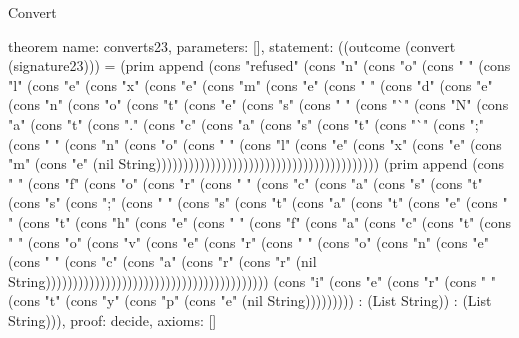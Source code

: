 \begin{lexlean}{Convert}
\begin{semanticmodule}
theorem{
  name: converts23,
  parameters: [],
  statement: ((outcome (convert (signature23))) = (prim append (cons "refused" (cons "n" (cons "o" (cons " " (cons "l" (cons "e" (cons "x" (cons "e" (cons "m" (cons "e" (cons " " (cons "d" (cons "e" (cons "n" (cons "o" (cons "t" (cons "e" (cons "s" (cons " " (cons "`" (cons "N" (cons "a" (cons "t" (cons "." (cons "c" (cons "a" (cons "s" (cons "t" (cons "`" (cons ";" (cons " " (cons "n" (cons "o" (cons " " (cons "l" (cons "e" (cons "x" (cons "e" (cons "m" (cons "e" (nil String))))))))))))))))))))))))))))))))))))))))) (prim append (cons " " (cons "f" (cons "o" (cons "r" (cons " " (cons "c" (cons "a" (cons "s" (cons "t" (cons "s" (cons ";" (cons " " (cons "s" (cons "t" (cons "a" (cons "t" (cons "e" (cons " " (cons "t" (cons "h" (cons "e" (cons " " (cons "f" (cons "a" (cons "c" (cons "t" (cons " " (cons "o" (cons "v" (cons "e" (cons "r" (cons " " (cons "o" (cons "n" (cons "e" (cons " " (cons "c" (cons "a" (cons "r" (cons "r" (nil String))))))))))))))))))))))))))))))))))))))))) (cons "i" (cons "e" (cons "r" (cons " " (cons "t" (cons "y" (cons "p" (cons "e" (nil String))))))))) : (List String)) : (List String))),
  proof: decide{},
  axioms: []
}


\end{semanticmodule}
\end{lexlean}
